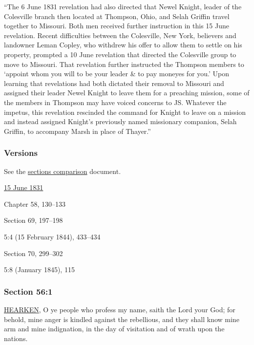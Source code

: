 			``The 6 June 1831 revelation had also directed that Newel Knight, leader of the Colesville branch then located at Thompson, Ohio, and Selah Griffin travel together to Missouri. Both men received further instruction in this 15 June revelation. Recent difficulties between the Colesville, New York, believers and landowner Leman Copley, who withdrew his offer to allow them to settle on his property, prompted a 10 June revelation that directed the Colesville group to move to Missouri. That revelation further instructed the Thompson members to `appoint whom you will to be your leader \& to pay moneyes for you.' Upon learning that revelations had both dictated their removal to Missouri and assigned their leader Newel Knight to leave them for a preaching mission, some of the members in Thompson may have voiced concerns to JS. Whatever the impetus, this revelation rescinded the command for Knight to leave on a mission and instead assigned Knight's previously named missionary companion, Selah Griffin, to accompany Marsh in place of Thayer.''
		
	\subsubsection{Versions}
		\label{DC56-V}
		
		See the \href{https://drive.google.com/file/d/1goAvNz8jS4R8slYfMG_db55Ty2z_vmgK/view?usp=sharing}{sections comparison} document.
	
		\begin{compactdesc}
			\item[JSP] \hyperref[EMS-1831-JS-15-JUN-1831]{15 June 1831}
			\item[BC] Chapter 58, 130--133
			\item[DC 1835] Section 69, 197--198
			\item[TS] 5:4 (15 February 1844), 433--434
			\item[DC 1844] Section 70, 299--302
			\item[MS] 5:8 (January 1845), 115
		\end{compactdesc}

	\subsubsection{Section 56:1} %
		\label{DC56-1}

		\hyperref[HEARKEN]{HEARKEN}, O ye people who profess my name, saith the Lord your God; for behold, mine anger is kindled against the rebellious, and they shall know mine arm and mine indignation, in the day of visitation and of wrath upon the nations.

